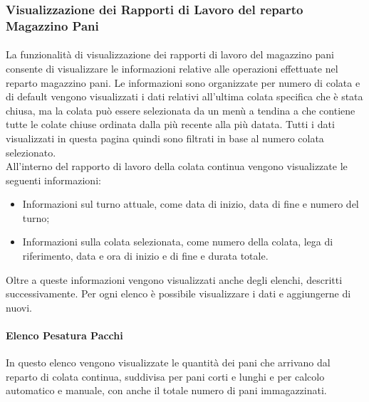   \subsubsection{Visualizzazione dei Rapporti di Lavoro del reparto Magazzino Pani}
  \paragraph{}
  La funzionalità di visualizzazione dei rapporti di lavoro del magazzino pani consente di visualizzare 
  le informazioni relative alle operazioni effettuate nel reparto magazzino pani. Le informazioni sono 
  organizzate per numero di colata e di default vengono visualizzati i dati relativi all'ultima colata specifica che è 
  stata chiusa, ma la colata può essere selezionata da un menù a tendina a che contiene tutte le colate chiuse ordinata 
  dalla più recente alla più datata. Tutti i dati visualizzati in questa pagina quindi sono filtrati in base al numero colata selezionato.\\
  All’interno del rapporto di lavoro della colata continua vengono visualizzate le seguenti informazioni:
  \begin{itemize}
    \item Informazioni sul turno attuale, come data di inizio, data di fine e numero del turno;
    \item Informazioni sulla colata selezionata, come numero della colata, lega di riferimento, data e ora 
    di inizio e di fine e durata totale.
  \end{itemize}
  Oltre a queste informazioni vengono visualizzati anche degli elenchi, descritti successivamente. 
  Per ogni elenco è possibile visualizzare i dati e aggiungerne di nuovi.
    
  \paragraph{Elenco Pesatura Pacchi}
  In questo elenco vengono visualizzate le quantità dei pani che arrivano dal reparto di colata continua, 
  suddivisa per pani corti e lunghi e per calcolo automatico e manuale, con anche il totale numero di pani 
  immagazzinati.

